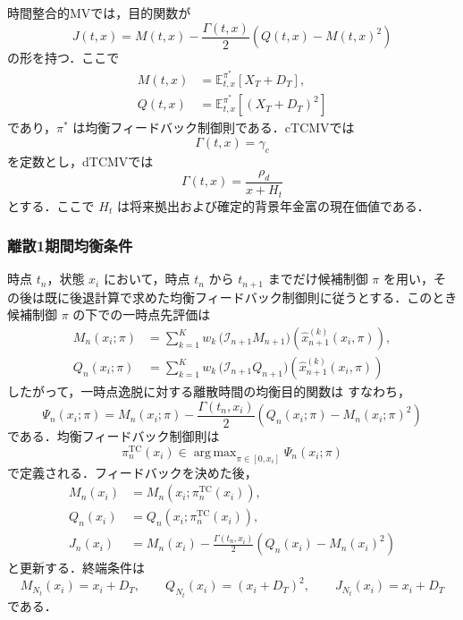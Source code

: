 \documentclass[10pt,a4paper]{article}
\theoremstyle{plain}
\theoremstyle{definition}
\newcommand{\E}{\mathbb{E}}
\DeclareMathOperator*{\argmax}{arg\,max}
\begin{document}
時間整合的MVでは，目的関数が
\begin{equation}
  J(t,x)=M(t,x)-\frac{\Gamma(t,x)}{2}
  \left(Q(t,x)-M(t,x)^2\right)
  \label{eq:tc-objective}
\end{equation}
の形を持つ．ここで
\begin{align}
  M(t,x)&=\E_{t,x}^{\pi^*}[X_T+D_T],\label{eq:M-def}\\
  Q(t,x)&=\E_{t,x}^{\pi^*}[(X_T+D_T)^2]\label{eq:Q-def}
\end{align}
であり，$\pi^*$ は均衡フィードバック制御則である．cTCMVでは
\begin{equation}
  \Gamma(t,x)=\gamma_c
  \label{eq:gamma-c}
\end{equation}
を定数とし，dTCMVでは
\begin{equation}
  \Gamma(t,x)=\frac{\rho_d}{x+H_t}
  \label{eq:gamma-d}
\end{equation}
とする．ここで $H_t$ は将来拠出および確定的背景年金富の現在価値である．

\subsubsection{離散1期間均衡条件}

時点 $t_n$，状態 $x_i$ において，時点 $t_n$ から $t_{n+1}$ までだけ候補制御 $\pi$ を用い，その後は既に後退計算で求めた均衡フィードバック制御則に従うとする．このとき候補制御 $\pi$ の下での一時点先評価は
\begin{align}
  M_n(x_i;\pi)
  &=\sum_{k=1}^K w_k\,
  \bigl(\mathcal I_{n+1}M_{n+1}\bigr)
  \left(\widehat{x}_{n+1}^{(k)}(x_i,\pi)\right),
  \label{eq:Mpi-gh}\\
  Q_n(x_i;\pi)
  &=\sum_{k=1}^K w_k\,
  \bigl(\mathcal I_{n+1}Q_{n+1}\bigr)
  \left(\widehat{x}_{n+1}^{(k)}(x_i,\pi)\right)
  \label{eq:Qpi-gh}
\end{align}
したがって，一時点逸脱に対する離散時間の均衡目的関数は
すなわち，
\begin{equation}
  \Psi_n(x_i;\pi)
  =M_n(x_i;\pi)
  -\frac{\Gamma(t_n,x_i)}{2}
  \left(Q_n(x_i;\pi)-M_n(x_i;\pi)^2\right)
  \label{eq:Psi-pi-clean}
\end{equation}
である．均衡フィードバック制御則は
\begin{equation}
  \pi_n^{\mathrm{TC}}(x_i)
  \in\argmax_{\pi\in[0,x_i]}\Psi_n(x_i;\pi)
  \label{eq:tc-feedback-discrete}
\end{equation}
で定義される．フィードバックを決めた後，
\begin{align}
  M_n(x_i)&=M_n\!\left(x_i;\pi_n^{\mathrm{TC}}(x_i)\right),
  \label{eq:M-update-TC}\\
  Q_n(x_i)&=Q_n\!\left(x_i;\pi_n^{\mathrm{TC}}(x_i)\right),
  \label{eq:Q-update-TC}\\
  J_n(x_i)&=M_n(x_i)-\frac{\Gamma(t_n,x_i)}{2}
  \left(Q_n(x_i)-M_n(x_i)^2\right)
  \label{eq:J-update-TC}
\end{align}
と更新する．終端条件は
\begin{equation}
  M_{N_t}(x_i)=x_i+D_T,
  \qquad Q_{N_t}(x_i)=(x_i+D_T)^2,
  \qquad J_{N_t}(x_i)=x_i+D_T
  \label{eq:tc-terminal}
\end{equation}
である．
\end{document}
